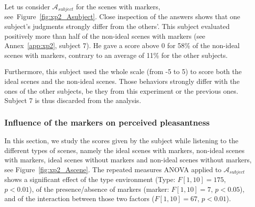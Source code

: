 \documentclass[12pt]{elsarticle}
\begin{document}
Let us consider $\mathcal{A}_{subject}$ for the scenes with markers, see~Figure~\ref{fig:xp2_Asubject}. Close inspection of the answers shows that one subject's judgments strongly differ from the others'. This subject evaluated positively more than half of the non-ideal scenes with markers (see Annex~\ref{app:xp2}, subject 7). He gave a score above 0 for 58\% of the non-ideal scenes with markers, contrary to an average of 11\% for the other subjects.

Furthermore, this subject used the whole scale (from -5 to 5) to score both the ideal scenes and the non-ideal scenes. Those behaviors strongly differ with the ones of the other subjects, be they from this experiment or the previous ones. Subject 7 is thus discarded from the analysis.

\subsubsection{Influence of the markers on perceived pleasantness}


In this section, we study the scores given by the subject while listening to the different types of scenes, namely the ideal scenes with markers, non-ideal scenes with markers, ideal scenes without markers and non-ideal scenes without markers, see Figure~\ref{fig:xp2_Ascene}. The repeated measures ANOVA applied to $\mathcal{A}_{subject}$ shows a significant effect of the type environment (Type: $F[1,10]=175$, $p<0.01$), of the presence/absence of markers (marker: $F[1,10]=7$, $p<0.05$), and of the interaction between those two factors ($F[1,10]=67$, $p<0.01$).


\end{document}
